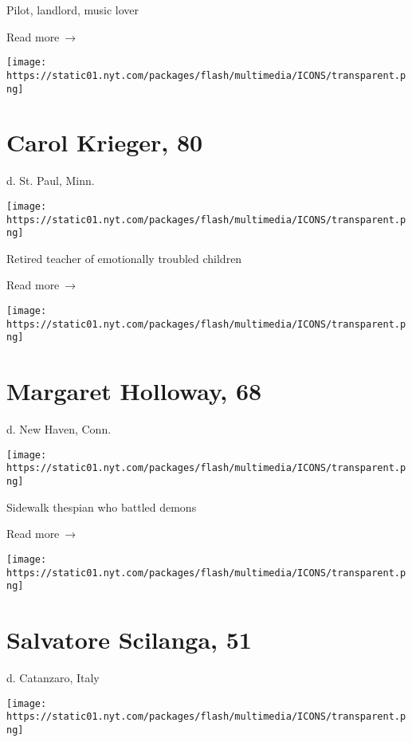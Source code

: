 Pilot, landlord, music lover

 Read more~→

\href{https://www.nytimes.com/2020/06/12/obituaries/carol-krieger-dead-coronavirus.html}{}

\texttt{[image: https://static01.nyt.com/packages/flash/multimedia/ICONS/transparent.png]}

\hypertarget{carol-krieger-80}{%
\section{Carol Krieger, 80}\label{carol-krieger-80}}

d. St. Paul, Minn.

\texttt{[image: https://static01.nyt.com/packages/flash/multimedia/ICONS/transparent.png]}

Retired teacher of emotionally troubled children

 Read more~→

\href{https://www.nytimes.com/2020/06/11/nyregion/margaret-holloway-the-shakespeare-lady-of-new-haven-dies-at-68.html}{}

\texttt{[image: https://static01.nyt.com/packages/flash/multimedia/ICONS/transparent.png]}

\hypertarget{margaret-holloway-68}{%
\section{Margaret Holloway, 68}\label{margaret-holloway-68}}

d. New Haven, Conn.

\texttt{[image: https://static01.nyt.com/packages/flash/multimedia/ICONS/transparent.png]}

Sidewalk thespian who battled demons

 Read more~→

\href{https://www.nytimes.com/2020/06/11/obituaries/salvatore-scilanga-dead-coronavirus.html}{}

\texttt{[image: https://static01.nyt.com/packages/flash/multimedia/ICONS/transparent.png]}

\hypertarget{salvatore-scilanga-51}{%
\section{Salvatore Scilanga, 51}\label{salvatore-scilanga-51}}

d. Catanzaro, Italy

\texttt{[image: https://static01.nyt.com/packages/flash/multimedia/ICONS/transparent.png]}

